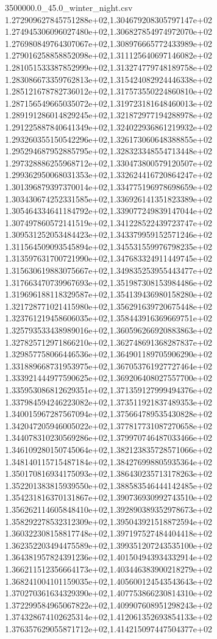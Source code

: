 \begin{filecontents*}{3500000.0_45.0_winter_night.csv}
1.272909627845751288e+02,1.304679208305797147e+02
1.274945306096027480e+02,1.306827854974972070e+02
1.276980849764307067e+02,1.308976665772433989e+02
1.279016258858852098e+02,1.311125640697146082e+02
1.281051533387852999e+02,1.313274779748189758e+02
1.283086673359762813e+02,1.315424082924446338e+02
1.285121678782736012e+02,1.317573550224860810e+02
1.287156549665035072e+02,1.319723181648460013e+02
1.289191286014829245e+02,1.321872977194288978e+02
1.291225887840641349e+02,1.324022936861219932e+02
1.293260355150542296e+02,1.326173060648388855e+02
1.295294687952885795e+02,1.328323348554713448e+02
1.297328886255968712e+02,1.330473800579120507e+02
1.299362950068031353e+02,1.332624416720864247e+02
1.301396879397370014e+02,1.334775196978698659e+02
1.303430674252331585e+02,1.336926141351823389e+02
1.305464334641184792e+02,1.339077249839147044e+02
1.307497860572141519e+02,1.341228522439723747e+02
1.309531252053484423e+02,1.343379959152571246e+02
1.311564509093545894e+02,1.345531559976798235e+02
1.313597631700721990e+02,1.347683324911449745e+02
1.315630619883075667e+02,1.349835253955443477e+02
1.317663470739967693e+02,1.351987308153984486e+02
1.319696188118329587e+02,1.354139436980158280e+02
1.321728771021415980e+02,1.356291639720675448e+02
1.323761219458606035e+02,1.358443916369669751e+02
1.325793533438989016e+02,1.360596266920883863e+02
1.327825712971866210e+02,1.362748691368287837e+02
1.329857758066446536e+02,1.364901189705906290e+02
1.331889668731953975e+02,1.367053761927727464e+02
1.333921444977590625e+02,1.369206408027557700e+02
1.335953086812629351e+02,1.371359127999494376e+02
1.337984594246223082e+02,1.373511921837489353e+02
1.340015967287567094e+02,1.375664789535430828e+02
1.342047205946005022e+02,1.377817731087270658e+02
1.344078310230569286e+02,1.379970746487033466e+02
1.346109280150745064e+02,1.382123835728571066e+02
1.348140115715487184e+02,1.384276998805935364e+02
1.350170816934175093e+02,1.386430235713178263e+02
1.352201383815939550e+02,1.388583546444142485e+02
1.354231816370131867e+02,1.390736930992743510e+02
1.356262114605848410e+02,1.392890389352978673e+02
1.358292278532312309e+02,1.395043921518872594e+02
1.360322308158817748e+02,1.397197527484404418e+02
1.362352203494475589e+02,1.399351207243535100e+02
1.364381957824391236e+02,1.401504943934332914e+02
1.366211512356664173e+02,1.403446383900218279e+02
1.368241004101159035e+02,1.405600124543543643e+02
1.370270361634329390e+02,1.407753866230814310e+02
1.372299584965067822e+02,1.409907608951298243e+02
1.374328674102625314e+02,1.412061352693854133e+02
1.376357629055871712e+02,1.414215097447504377e+02

\end{filecontents*}
